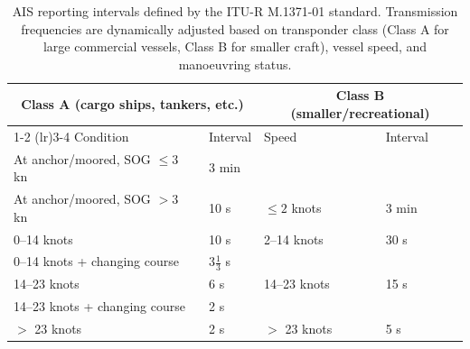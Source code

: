 \begin{table}[t]
\centering
\begin{tabular}{ll ll}
\toprule
\multicolumn{2}{c}{\textbf{Class A (cargo ships, tankers, etc.)}}
& \multicolumn{2}{c}{\textbf{Class B (smaller/recreational)}} \\
\cmidrule(lr){1-2} \cmidrule(lr){3-4}
Condition & Interval & Speed & Interval \\
\midrule
At anchor/moored, SOG $\le 3$ kn    & 3 min              &                &        \\
At anchor/moored, SOG $> 3$ kn      & 10 s               & $\le 2$ knots  & 3 min  \\
0--14 knots                         & 10 s               & 2--14 knots    & 30 s   \\
0--14 knots + changing course       & $3\frac{1}{3}$ s   &                &        \\
14--23 knots                        & 6 s                & 14--23 knots   & 15 s   \\
14--23 knots + changing course      & 2 s                &                &        \\
$>$ 23 knots                        & 2 s                & $>$ 23 knots   & 5 s    \\
\bottomrule
\end{tabular}
\caption[AIS Reporting Intervals]{\acf{AIS} reporting intervals defined by the ITU-R M.1371-01 standard. Transmission frequencies are dynamically adjusted based on  transponder class (Class A for large commercial vessels, Class B for smaller craft), vessel speed, and manoeuvring status.}
\label{tab:ais-frequencies}
\end{table}

